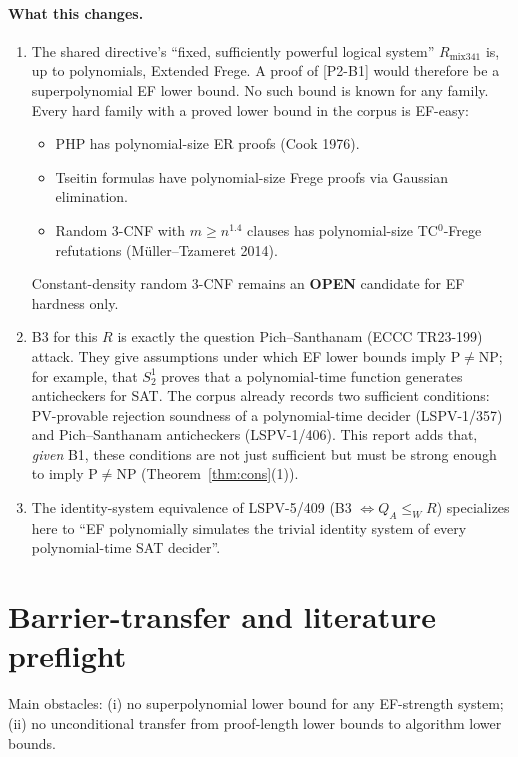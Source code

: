 \documentclass[11pt]{article}
\theoremstyle{remark}
\begin{document}
\paragraph{What this changes.}
\begin{enumerate}
\item The shared directive's ``fixed, sufficiently powerful logical system'' $R_{\mathrm{mix341}}$ is, up to polynomials, Extended Frege. A proof of [P2-B1] would therefore be a superpolynomial EF lower bound. No such bound is known for any family. Every hard family with a proved lower bound in the corpus is EF-easy:
\begin{itemize}
\item PHP has polynomial-size ER proofs (Cook 1976).
\item Tseitin formulas have polynomial-size Frege proofs via Gaussian elimination.
\item Random 3-CNF with $m\ge n^{1.4}$ clauses has polynomial-size TC$^0$-Frege refutations (M\"uller--Tzameret 2014).
\end{itemize}
Constant-density random 3-CNF remains an \textbf{OPEN} candidate for EF hardness only.
\item B3 for this $R$ is exactly the question Pich--Santhanam (ECCC TR23-199) attack. They give assumptions under which EF lower bounds imply P$\neq$NP; for example, that $S^1_2$ proves that a polynomial-time function generates anticheckers for SAT. The corpus already records two sufficient conditions: PV-provable rejection soundness of a polynomial-time decider (LSPV-1/357) and Pich--Santhanam anticheckers (LSPV-1/406). This report adds that, \emph{given} B1, these conditions are not just sufficient but must be strong enough to imply P$\neq$NP (Theorem~\ref{thm:cons}(1)).
\item The identity-system equivalence of LSPV-5/409 (B3 $\iff Q_A\le_W R$) specializes here to ``EF polynomially simulates the trivial identity system of every polynomial-time SAT decider''.
\end{enumerate}

\section{Barrier-transfer and literature preflight}
Main obstacles: (i) no superpolynomial lower bound for any EF-strength system; (ii) no unconditional transfer from proof-length lower bounds to algorithm lower bounds.
\end{document}
